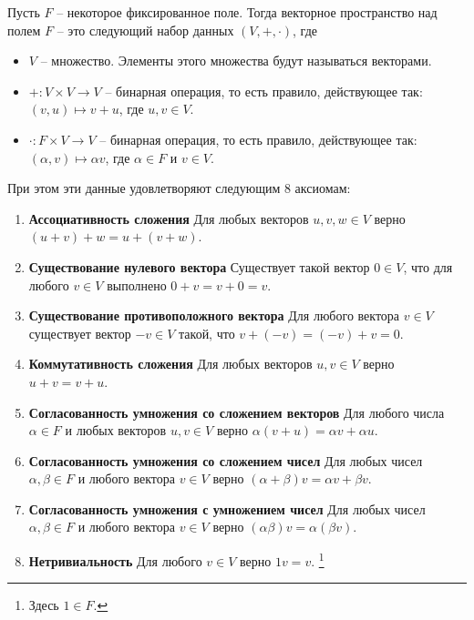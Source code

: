 \documentclass{article}
\begin{document}
\begin{definition*}
	\label{def::VectorSpace}
	Пусть $F$ -- некоторое фиксированное поле.
	Тогда векторное пространство над полем $F$ -- это следующий набор данных $(V, +, \cdot)$, где
	\begin{itemize}
		\item $V$ -- множество.
		Элементы этого множества будут называться векторами.
		
		\item $+\colon V \times V \to V$ -- бинарная операция, то есть правило, действующее так: $(v,u)\mapsto v + u$, где $u,v \in V$.
		
		\item $\cdot \colon F \times V \to V$ -- бинарная операция, то есть правило, действующее так: $(\alpha, v)\mapsto \alpha v$, где $\alpha \in F$ и $v\in V$.
	\end{itemize}
	При этом эти данные удовлетворяют следующим $8$ аксиомам:
	\begin{enumerate}
		\item {\bf Ассоциативность сложения} Для любых векторов $u,v,w\in V$ верно $(u+v) + w = u + (v+w)$.
		
		\item {\bf Существование нулевого вектора} Существует такой вектор $0\in V$, что для любого $v\in V$ выполнено $0 + v = v + 0 = v$.
		
		\item {\bf Существование противоположного вектора} Для любого вектора $v\in V$ существует вектор $-v\in V$ такой, что $v + (-v) = (-v) + v = 0$.
		
		\item {\bf Коммутативность сложения} Для любых векторов $u,v \in V$ верно $u + v = v + u$.
		
		\item {\bf Согласованность умножения со сложением векторов} Для любого числа $\alpha \in F$ и любых векторов $u,v \in V$ верно $\alpha(v + u) = \alpha v + \alpha u$.
		
		\item {\bf Согласованность умножения со сложением чисел} Для любых чисел $\alpha, \beta\in F$ и любого вектора $v\in V$ верно $(\alpha + \beta)v = \alpha v + \beta v$.
		
		\item {\bf Согласованность умножения с умножением чисел} Для любых чисел $\alpha,\beta\in F$ и любого вектора $v\in V$ верно $(\alpha\beta)v = \alpha(\beta v)$.
		
		\item {\bf Нетривиальность} Для любого $v\in V$ верно $1 v = v$.%
		\footnote{Здесь $1\in F$.}
	\end{enumerate}
\end{definition*}
\end{document}
